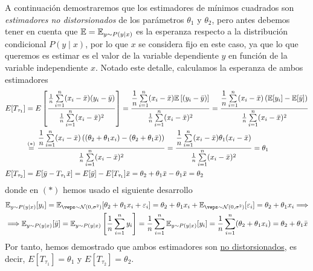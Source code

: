 \noindent
A continuación demostraremos que los estimadores de mínimos cuadrados son \textit{estimadores no distorsionados} de los parámetros $\theta_1$ y $\theta_2$, pero antes debemos tener en cuenta que $\mathbb{E}=\mathbb{E}_{y\sim P(y\mid x)}$ es la esperanza respecto a la distribución condicional $P(y\mid x)$, por lo que $x$ se considera fijo en este caso, ya que lo que queremos es estimar es el valor de la variable dependiente $y$ en función de la variable independiente $x$. Notado este detalle, calculamos la esperanza de ambos estimadores
\begin{align*}
    E[T_{\tau_1}] &= E\left[ \dfrac{\frac{1}{n} \sum\limits_{i=1}^{n} (x_i-\bar{x})(y_i-\bar{y})}{\frac{1}{n} \sum\limits_{i=1}^{n}(x_i-\bar{x})^2} \right] = \dfrac{\dfrac{1}{n} \sum\limits_{i=1}^{n} (x_i-\bar{x})\mathbb{E}\left[(y_i-\bar{y}) \right] }{\frac{1}{n} \sum\limits_{i=1}^{n}(x_i-\bar{x})^2} = \dfrac{\dfrac{1}{n} \sum\limits_{i=1}^{n} (x_i-\bar{x}) \left( \mathbb{E}[y_i] - \mathbb{E}[\bar{y}] \right) }{\frac{1}{n} \sum\limits_{i=1}^{n}(x_i-\bar{x})^2} \\
    & \overset{(*)}{=} \dfrac{\dfrac{1}{n} \sum\limits_{i=1}^{n} (x_i-\bar{x}) \left( (\theta_2 + \theta_1 x_i) - (\theta_2 + \theta_1 \bar{x}) \right) }{\frac{1}{n} \sum\limits_{i=1}^{n}(x_i-\bar{x})^2} = \dfrac{\dfrac{1}{n} \sum\limits_{i=1}^{n} (x_i-\bar{x}) \theta_1 (x_i - \bar{x}) }{\frac{1}{n} \sum\limits_{i=1}^{n}(x_i-\bar{x})^2} = \theta_1 \\
    E[T_{\tau_2}] &= E[\bar{y} - T_{\tau_1} \bar{x}] = E[\bar{y}] - E[T_{\tau_1}] \bar{x} = \theta_2+\theta_1 \bar{x} - \theta_1 \bar{x}=\theta_2 \\
\end{align*}
donde en $(*)$ hemos usado el siguiente desarrollo
\begin{align*}
    & \E_{y\sim P(y\mid x)}[y_i]= \E_{\veps\sim\cc{N}(0,\sigma^2)}[\theta_2 + \theta_1 x_i + \varepsilon_i] = \theta_2 + \theta_1 x_i + \E_{\veps\sim\cc{N}(0,\sigma^2)}[\varepsilon_i] = \theta_2 + \theta_1 x_i \Longrightarrow \\
    & \Longrightarrow \E_{y\sim P(y\mid x)}[\bar{y}]= \E_{y\sim P(y\mid x)}\left[\dfrac{1}{n} \sum\limits_{i=1}^{n} y_i \right] = \dfrac{1}{n} \sum\limits_{i=1}^{n} \E_{y\sim P(y\mid x)}[y_i] = \dfrac{1}{n} \sum\limits_{i=1}^{n} (\theta_2 + \theta_1 x_i) = \theta_2 + \theta_1 \bar{x}
\end{align*}
Por tanto, hemos demostrado que ambos estimadores son \underline{no distorsionados}, es decir, $E[T_{\tau_1}] = \theta_1$ y $E[T_{\tau_2}] = \theta_2$. \\

